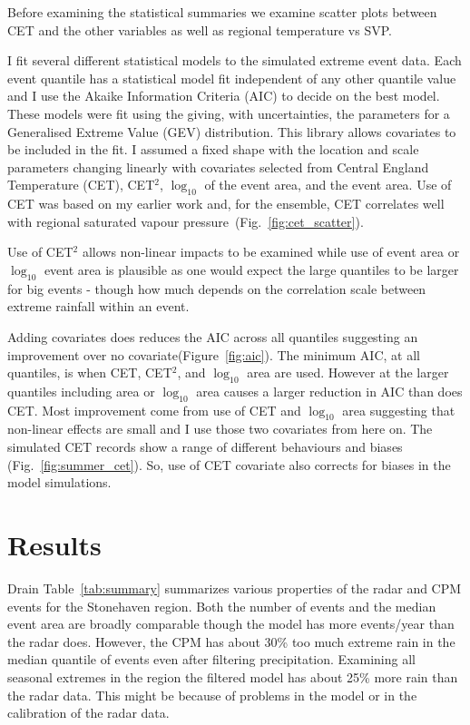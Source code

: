 \documentclass[11pt,a4paper]{article}
\begin{document}
Before examining  the statistical summaries we examine scatter plots between CET and the other variables as well as regional temperature vs SVP.  

I fit several different statistical models to the simulated  extreme event data. Each event quantile has a  statistical model fit independent of any other quantile value and I use the Akaike Information Criteria (AIC) to decide on the best model\parencite{akaike74aic}. These models were fit using the  giving, with uncertainties, the parameters for a Generalised Extreme Value (GEV) distribution.   This library allows covariates to be included in the fit. I assumed a fixed shape with the location and scale parameters changing linearly with covariates selected from  Central England Temperature (CET), CET$^2$,  $\log_{10}$ of the event area, and the event area.  Use of CET was based on my earlier work\parencite{tett2023edinburgh} and, for the ensemble, CET correlates well with regional saturated vapour pressure~(Fig.~\ref{fig:cet_scatter}). 

 
 Use of CET$^2$ allows non-linear impacts to be examined while use of  event area or $\log_{10}$ event area is plausible as one would expect the large quantiles to be larger for big events - though how much depends on the correlation scale between extreme rainfall within an event. 

Adding covariates does reduces the AIC across all quantiles suggesting an improvement over no covariate(Figure~\ref{fig:aic}). The minimum AIC, at all quantiles, is when CET, CET$^2$,  and $\log_{10}$ area are used. However at the larger quantiles including area or $\log_{10}$ area causes a larger reduction in AIC than does CET.  Most improvement come from use of CET and $\log_{10}$ area suggesting that non-linear effects are small and I use those two covariates from here on. 
The simulated CET records show a range of different behaviours and biases (Fig.~\ref{fig:summer_cet}). So, use of CET covariate also corrects for biases in the model simulations. 


\section{Results}
Drain
Table~\ref{tab:summary} summarizes various properties of the radar and CPM events for the Stonehaven region.  Both the number of events and the median event area are broadly comparable though the model has more events/year than the radar does.  However, the CPM has about 30\% too much extreme rain in the median quantile of events even after filtering precipitation. Examining  all seasonal extremes in the region the filtered model has about 25\% more rain than the radar data.  This might be because of problems in the model or in the calibration of the radar data. 
\end{document}
